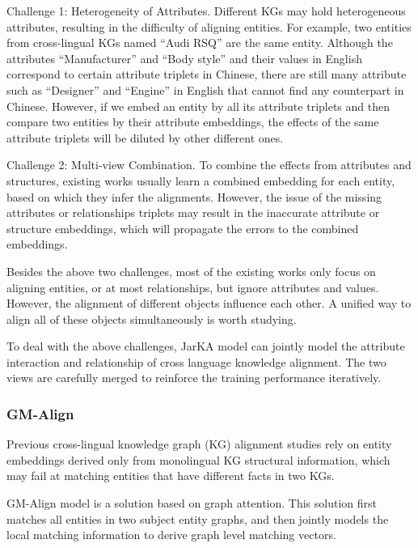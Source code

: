 \documentclass[sigconf]{acmart}
\begin{document}
{Challenge 1: Heterogeneity of Attributes. Different KGs may hold heterogeneous attributes, resulting in the difficulty of aligning entities. For example, two entities from cross-lingual KGs named “Audi RSQ” are the same entity. Although the attributes “Manufacturer” and “Body style” and their values in English correspond to certain attribute triplets in Chinese, there are still many attribute such as “Designer” and “Engine” in English that cannot find any counterpart in Chinese. However, if we embed an entity by all its attribute triplets and then compare two entities by their attribute embeddings, the effects of the same attribute triplets will be diluted by other different ones.

Challenge 2: Multi-view Combination. To combine the effects from attributes and structures, existing works usually learn a combined embedding for each entity, based on which they infer the alignments. However, the issue of the missing attributes or relationships triplets may result in the inaccurate attribute or structure embeddings, which will propagate the errors to the combined embeddings.

Besides the above two challenges, most of the existing works only focus on aligning entities, or at most relationships, but ignore attributes and values. However, the alignment of different objects influence each other. A unified way to align all of these objects simultaneously is worth studying.

To deal with the above challenges, JarKA model can jointly model the attribute interaction and relationship of cross language knowledge alignment. The two views are carefully merged to reinforce the training performance iteratively. 

\subsubsection{GM-Align \cite{xu2019cross}}

Previous cross-lingual knowledge graph (KG) alignment studies rely on entity embeddings derived only from monolingual KG structural information, which may fail at matching entities that have different facts in two KGs. 

GM-Align model is a solution based on graph attention. This solution first matches all entities in two subject entity graphs, and then jointly models the local matching information to derive graph level matching vectors.

}
\end{document}
